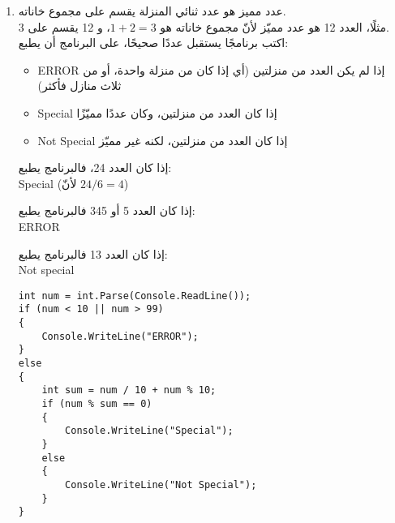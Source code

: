 \documentclass[12pt]{article}
\begin{document}
\begin{enumerate}[itemsep=2em]
\item
عدد مميز هو عدد ثنائي المنزلة يقسم على مجموع خاناته. \\
مثلًا، العدد 12 هو عدد مميّز لأنّ مجموع خاناته هو $1+2=3$، و 12 يقسم على 3. \\
اكتب برنامجًا يستقبل عددًا صحيحًا، على البرنامج أن يطبع:
\begin{itemize}
    \item \textenglish{ERROR} إذا لم يكن العدد من  منزلتين (أي إذا كان من منزلة واحدة، أو من ثلاث منازل فأكثر)
    \item \textenglish{Special} إذا كان العدد من منزلتين، وكان عددًا مميّزًا
    \item \textenglish{Not Special} إذا كان العدد من منزلتين، لكنه غير مميّز
\end{itemize}
\begin{boxExample}[1]
    إذا كان العدد 24، فالبرنامج يطبع: \\
    \textenglish{Special}
    (لأنّ $24/6=4$)
\end{boxExample}
\begin{boxExample}[2]
    إذا كان العدد 5  أو  345 فالبرنامج يطبع: \\
    \textenglish{ERROR}
\end{boxExample}
\begin{boxExample}[3]
    إذا كان العدد 13 فالبرنامج يطبع: \\
    \textenglish{Not special}
\end{boxExample}

\ifwithsols
\begin{boxSolution}
\begin{english}
\begin{verbatim}
int num = int.Parse(Console.ReadLine());
if (num < 10 || num > 99)
{
    Console.WriteLine("ERROR");
}
else
{
    int sum = num / 10 + num % 10;
    if (num % sum == 0)
    {
        Console.WriteLine("Special");
    }
    else
    {
        Console.WriteLine("Not Special");
    }
}
\end{verbatim}
\end{english}
\end{boxSolution}
\fi

\end{enumerate}
\end{document}
